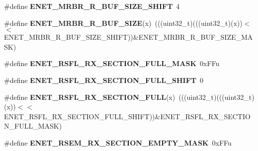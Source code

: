 \begin{DoxyCompactItemize}
\item 
\#define {\bfseries E\+N\+E\+T\+\_\+\+M\+R\+B\+R\+\_\+\+R\+\_\+\+B\+U\+F\+\_\+\+S\+I\+Z\+E\+\_\+\+S\+H\+I\+FT}~4\hypertarget{group__ENET__Register__Masks_ga97d12f7cd393b851484d3bbdcd4614b2}{}\label{group__ENET__Register__Masks_ga97d12f7cd393b851484d3bbdcd4614b2}

\item 
\#define {\bfseries E\+N\+E\+T\+\_\+\+M\+R\+B\+R\+\_\+\+R\+\_\+\+B\+U\+F\+\_\+\+S\+I\+ZE}(x)~(((uint32\+\_\+t)(((uint32\+\_\+t)(x))$<$$<$E\+N\+E\+T\+\_\+\+M\+R\+B\+R\+\_\+\+R\+\_\+\+B\+U\+F\+\_\+\+S\+I\+Z\+E\+\_\+\+S\+H\+I\+FT))\&E\+N\+E\+T\+\_\+\+M\+R\+B\+R\+\_\+\+R\+\_\+\+B\+U\+F\+\_\+\+S\+I\+Z\+E\+\_\+\+M\+A\+SK)\hypertarget{group__ENET__Register__Masks_ga236137ed06ec6b5e9bab8e945351da71}{}\label{group__ENET__Register__Masks_ga236137ed06ec6b5e9bab8e945351da71}

\item 
\#define {\bfseries E\+N\+E\+T\+\_\+\+R\+S\+F\+L\+\_\+\+R\+X\+\_\+\+S\+E\+C\+T\+I\+O\+N\+\_\+\+F\+U\+L\+L\+\_\+\+M\+A\+SK}~0x\+F\+Fu\hypertarget{group__ENET__Register__Masks_ga415bf81c3a615e8ee3c7cd5dddc5a9a2}{}\label{group__ENET__Register__Masks_ga415bf81c3a615e8ee3c7cd5dddc5a9a2}

\item 
\#define {\bfseries E\+N\+E\+T\+\_\+\+R\+S\+F\+L\+\_\+\+R\+X\+\_\+\+S\+E\+C\+T\+I\+O\+N\+\_\+\+F\+U\+L\+L\+\_\+\+S\+H\+I\+FT}~0\hypertarget{group__ENET__Register__Masks_ga8d10ff4a7b7abbe2f089ccc4dddcdd46}{}\label{group__ENET__Register__Masks_ga8d10ff4a7b7abbe2f089ccc4dddcdd46}

\item 
\#define {\bfseries E\+N\+E\+T\+\_\+\+R\+S\+F\+L\+\_\+\+R\+X\+\_\+\+S\+E\+C\+T\+I\+O\+N\+\_\+\+F\+U\+LL}(x)~(((uint32\+\_\+t)(((uint32\+\_\+t)(x))$<$$<$E\+N\+E\+T\+\_\+\+R\+S\+F\+L\+\_\+\+R\+X\+\_\+\+S\+E\+C\+T\+I\+O\+N\+\_\+\+F\+U\+L\+L\+\_\+\+S\+H\+I\+FT))\&E\+N\+E\+T\+\_\+\+R\+S\+F\+L\+\_\+\+R\+X\+\_\+\+S\+E\+C\+T\+I\+O\+N\+\_\+\+F\+U\+L\+L\+\_\+\+M\+A\+SK)\hypertarget{group__ENET__Register__Masks_ga8fab46c0b08cc69ffba1bdce893dc57e}{}\label{group__ENET__Register__Masks_ga8fab46c0b08cc69ffba1bdce893dc57e}

\item 
\#define {\bfseries E\+N\+E\+T\+\_\+\+R\+S\+E\+M\+\_\+\+R\+X\+\_\+\+S\+E\+C\+T\+I\+O\+N\+\_\+\+E\+M\+P\+T\+Y\+\_\+\+M\+A\+SK}~0x\+F\+Fu\hypertarget{group__ENET__Register__Masks_ga7efbed880ef6db92d0b5afa9584e4a55}{}\label{group__ENET__Register__Masks_ga7efbed880ef6db92d0b5afa9584e4a55}


\end{DoxyCompactItemize}
